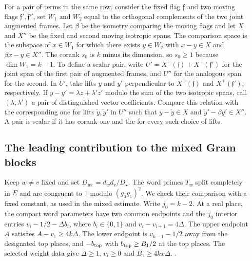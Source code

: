 For a pair of terms in the same row, consider the fixed flag
\(\mathfrak f\) and two moving
flags \(\mathfrak f',\mathfrak f''\), set \(W_1\) and \(W_2\) equal to
the orthogonal complements of the two joint augmented frames. Let
\(\beta\) be the isometry comparing the moving flags and let \(X\)
and \(X''\) be the fixed and second moving isotropic spans. The comparison
space is the subspace of \(x\in W_1\) for which there exists
\(y\in W_2\) with \(x-y\in X\) and \(\beta x-y\in X''\).
The corank \(s_0\) is \(k\) minus its dimension, so \(s_0\ge1\)
because \(\dim W_1=k-1\). To define a scalar pair, write
\(U' = X^+(\mathfrak f)+X^+(\mathfrak f')\) for the joint span of the
first pair of augmented frames, and \(U''\) for the analogous span for
the second. In \(U'\), take lifts \(y\) and \(y'\) perpendicular to
\(X^+(\mathfrak f)\) and \(X^+(\mathfrak f')\), respectively. If
\(y-y'=\lambda z+\lambda' z'\) modulo the sum of the two isotropic
spans, call \((\lambda,\lambda')\) a pair of distinguished-vector
coefficients. Compare this
relation with the corresponding one for lifts \(\tilde y,\tilde y'\)
in \(U''\) such that \(y-\tilde y\in X\) and
\(\tilde y'-\beta y'\in X''\). A pair is scalar if it has corank one
and the
for every such choice of lifts.

\subsection{The leading contribution to the mixed Gram blocks}

\leavevmode{}%
Keep \(w\ne v\) fixed and set \(D_{wv}=d_wd_v/D_\star\).
The word primes \(T_w\) split completely in \(E\) and are congruent
to \(1\) modulo \((g_0g_1)^2\). We check their comparison with a
fixed constant, as used in the mixed estimate. Write \(j_0=k-2\).
At a real place, the compact word parameters have two common
endpoints and the \(j_0\) interior entries \(v_i-1/2-\Delta b_i\),
where \(b_i\in\{0,1\}\) and \(v_i-v_{i+1}=4\Delta\).
The upper endpoint \(A\) satisfies \(A-v_1\ge4k\Delta\).
The lower endpoint is \(v_{k-1}-1/2\) away from the designated top
places, and \(-b_{\rm top}\) with \(b_{\rm top}\ge B_1/2\) at
the top places. The selected weight data give
\(\Delta\ge1\), \(v_i\ge0\) and \(B_1\ge4kx\Delta\).
.

